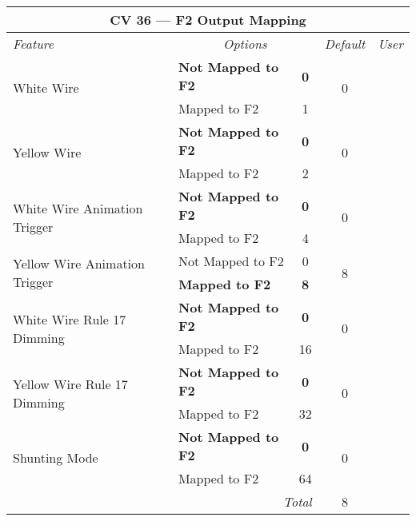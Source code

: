 \documentclass[12pt,letterpaper,draft]{memoir} %
\begin{document}
\label{CV36}
\begin{center}
\begin{tabular}{|l|lc|c|c|}
\hline
\multicolumn{5}{|c|}{\textbf{CV 36 --- F2 Output Mapping}} \\ \hline \hline
\textit{Feature} & \multicolumn{2}{c|}{\textit{Options}} & \textit{Default} & \textit{User} \\ \hline
\multirow{2}{*}{White Wire} & \textbf{Not Mapped to F2} & \textbf{0}	& 	\multirow{2}{*}{0}&\\
                            & Mapped to F2 & 1 & & \\ \hline
\multirow{2}{*}{Yellow Wire} & \textbf{Not Mapped to F2} & \textbf{0}	& 	\multirow{2}{*}{0}&\\
                            & Mapped to F2 & 2 & & \\ \hline
\multirow{2}{*}{White Wire Animation Trigger} & \textbf{Not Mapped to F2} & \textbf{0}	& 	\multirow{2}{*}{0}& \\
                           & Mapped to F2 & 4 & & \\ \hline
\multirow{2}{*}{Yellow Wire Animation Trigger} & Not Mapped to F2 & 0	& 	\multirow{2}{*}{8}& \\
                           & \textbf{Mapped to F2} & \textbf{8} & & \\ \hline
\multirow{2}{*}{White Wire Rule 17 Dimming} & \textbf{Not Mapped to F2} & \textbf{0}	& 	\multirow{2}{*}{0}& \\
                             & Mapped to F2 & 16 & & \\ \hline
\multirow{2}{*}{Yellow Wire Rule 17 Dimming} & \textbf{Not Mapped to F2} & \textbf{0}	& 	\multirow{2}{*}{0}&\\
                             & Mapped to F2 & 32 & & \\ \hline
\multirow{2}{*}{Shunting Mode} & \textbf{Not Mapped to F2} & \textbf{0}	& 	\multirow{2}{*}{0}&\\
                             & Mapped to F2 & 64 & & \\ \hline\hline
\multicolumn{3}{|r|}{\textit{Total}} & 8 &\\ \hline
\end{tabular}
\end{center}
\end{document}
